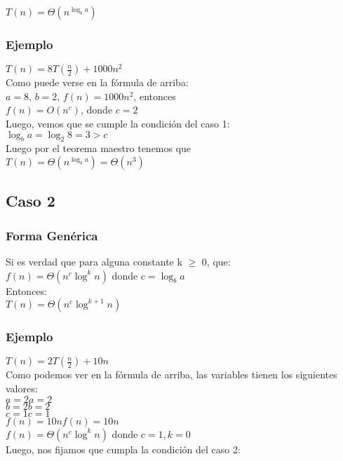 \documentclass{article} %
\begin{document}
${\displaystyle T(n)=\Theta \left(n^{\log _{b}a}\right)}$

\subsubsection{Ejemplo}
${\displaystyle T(n)=8T\left({\frac {n}{2}}\right)+1000n^{2}}$\\
Como puede verse en la fórmula de arriba:\\

${\displaystyle a=8,\,b=2,\,f(n)=1000n^{2}}$, entonces\\
${\displaystyle f(n)=O\left(n^{c}\right)}$, donde ${\displaystyle c=2}$\\
Luego, vemos que se cumple la condición del caso 1:\\

${\displaystyle \log _{b}a=\log _{2}8=3>c}$\\
Luego por el teorema maestro tenemos que\\

${\displaystyle T(n)=\Theta \left(n^{\log _{b}a}\right)=\Theta \left(n^{3}\right)}$

\subsection{Caso 2}
\subsubsection{Forma Genérica}
Si es verdad que para alguna constante k $\geq$ 0, que:\\

${\displaystyle f(n)=\Theta \left(n^{c}\log ^{k}n\right)}$ donde ${\displaystyle c=\log _{b}a}$\\
Entonces:\\

${\displaystyle T(n)=\Theta \left(n^{c}\log ^{k+1}n\right)}$
\subsubsection{Ejemplo}
${\displaystyle T(n)=2T\left({\frac {n}{2}}\right)+10n}$\\

Como podemos ver en la fórmula de arriba, las variables tienen los siguientes valores:\\

${\displaystyle a=2}{\displaystyle a=2}$\\
${\displaystyle b=2}{\displaystyle b=2}$\\
${\displaystyle c=1}{\displaystyle c=1}$\\
${\displaystyle f(n)=10n}{\displaystyle f(n)=10n}$\\
${\displaystyle f(n)=\Theta \left(n^{c}\log ^{k}n\right)}$ donde ${\displaystyle c=1,k=0}$\\
Luego, nos fijamos que cumpla la condición del caso 2:\\
\end{document}
